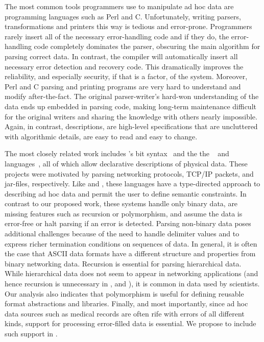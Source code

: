 \documentclass[11pt]{article}
\begin{document}
The most common tools programmers use to manipulate ad hoc data
are programming languages such as Perl and C.  
Unfortunately, writing parsers, transformations and printers this way
is tedious and error-prone.  Programmers rarely insert all of the
necessary error-handling code and if they do, the error-handling
code completely dominates the parser, obscuring the main algorithm
for parsing correct data.  In contrast, the \datatype{} compiler
will automatically insert all necessary error detection and recovery code.
This dramatically improves the reliability, and especially security,
if that is a factor, of the system.  Moreover, Perl and C parsing
and printing programs are very hard to understand and modify
after-the-fact.  The original parser-writer's hard-won
understanding of the data ends up embedded in parsing code, making
long-term maintenance difficult for the original writers and sharing
the knowledge with others nearly impossible.  Again, in contrast,
\datatype{} descriptions, are high-level specifications that are
uncluttered with algorithmic details, are easy to read and 
easy to change.

The most closely related work includes 
\erlang{}'s bit syntax~\cite{erlang} and the
the \packettypes{}~\cite{sigcomm00} and
\datascript{} languages~\cite{gpce02}, 
all of which allow declarative descriptions of physical data.  
These projects were motivated by parsing networking protocols,
\textsc{TCP/IP} packets, and \java{} jar-files, respectively.  Like
\pads{} and \datatype, these languages have a type-directed approach to
describing ad hoc data and permit the user to define semantic constraints.
In contrast to our proposed
work, these systems handle only binary data,
are missing features such as recursion or polymorphism, and assume the data is
error-free or halt parsing if an error is detected. 
Parsing non-binary data poses additional challenges because of the need
to handle delimiter values and to express richer termination conditions
on sequences of data.  In general, it is often the case that
ASCII data formats have a different structure and properties from binary
networking data.  Recursion is essential for parsing hierarchical
data.  While hierarchical data does not seem to appear in networking 
applications (and hence recursion is
unnecessary in \erlang, \packettypes{} and \datascript),
it is common in data used by scientists.  Our analysis also
indicates that polymorphism is useful for defining reusable
format abstractions and libraries.  Finally, and most 
importantly, since ad hoc data sources
such as medical records are often rife with errors
of all different kinds, support for processing error-filled data is
essential.  We propose to include such support in \datatype.
\end{document}
